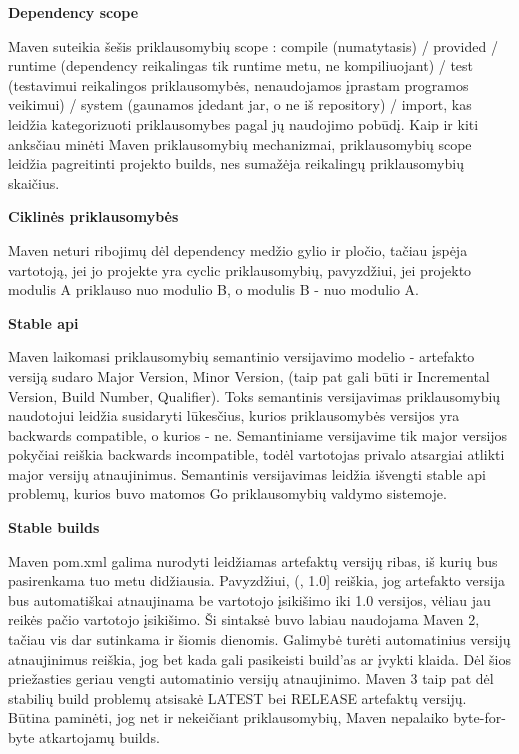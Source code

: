 \bigbreak
{\bf Dependency scope}
\bigbreak

Maven suteikia šešis priklausomybių scope : compile (numatytasis) / provided / runtime (dependency reikalingas tik runtime metu, ne kompiliuojant) / test (testavimui reikalingos priklausomybės, nenaudojamos įprastam programos veikimui) / system (gaunamos įdedant jar, o ne iš repository) / import, kas leidžia kategorizuoti priklausomybes pagal jų naudojimo pobūdį. Kaip ir kiti anksčiau minėti Maven priklausomybių mechanizmai, priklausomybių scope leidžia pagreitinti projekto builds, nes sumažėja reikalingų priklausomybių skaičius.

\bigbreak
{\bf Ciklinės priklausomybės}
\bigbreak

Maven neturi ribojimų dėl dependency medžio gylio ir pločio, tačiau įspėja vartotoją, jei jo projekte yra cyclic priklausomybių, pavyzdžiui, jei projekto modulis A priklauso nuo modulio B, o modulis B - nuo modulio A.

\bigbreak
{\bf Stable api}
\bigbreak

Maven laikomasi priklausomybių semantinio versijavimo modelio - artefakto versiją sudaro Major Version, Minor Version, (taip pat gali būti ir Incremental Version, Build Number, Qualifier). Toks semantinis versijavimas priklausomybių naudotojui leidžia susidaryti lūkesčius, kurios priklausomybės versijos yra backwards compatible, o kurios - ne. Semantiniame versijavime tik major versijos pokyčiai reiškia backwards incompatible, todėl vartotojas privalo atsargiai atlikti major versijų atnaujinimus. Semantinis versijavimas leidžia išvengti stable api problemų, kurios buvo matomos Go priklausomybių valdymo sistemoje.

\bigbreak
{\bf Stable builds}
\bigbreak

Maven pom.xml galima nurodyti leidžiamas artefaktų versijų ribas, iš kurių bus pasirenkama tuo metu didžiausia. Pavyzdžiui, (,  1.0] reiškia, jog artefakto versija bus automatiškai atnaujinama be vartotojo įsikišimo iki 1.0 versijos, vėliau jau reikės pačio vartotojo įsikišimo. Ši sintaksė buvo labiau naudojama Maven 2, tačiau vis dar sutinkama ir šiomis dienomis. Galimybė turėti automatinius versijų atnaujinimus reiškia, jog bet kada gali pasikeisti build’as ar įvykti klaida. Dėl šios priežasties geriau vengti automatinio versijų atnaujinimo. Maven 3 taip pat dėl stabilių build problemų atsisakė LATEST bei RELEASE artefaktų versijų. Būtina paminėti, jog net ir nekeičiant priklausomybių, Maven nepalaiko byte-for-byte atkartojamų builds.
